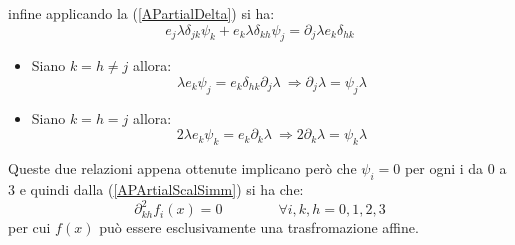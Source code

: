 infine applicando la (\ref{APartialDelta}) si ha:
\begin{equation*}
    e_j\lambda\delta_{jk}\psi_k+e_k\lambda\delta_{kh}\psi_j=\partial_j\lambda e_k \delta_{hk}
\end{equation*}
\begin{itemize}
    \item Siano $k=h\neq j$ allora:
    \begin{equation*}
        \lambda e_k\psi_j=e_k\delta_{hk}\partial_j\lambda \ \Rightarrow \partial_j\lambda=\psi_j\lambda
    \end{equation*}
    \item Siano $k=h= j$ allora:
    \begin{equation*}
        2\lambda e_k\psi_k=e_k\partial_k\lambda \ \Rightarrow 2\partial_k\lambda=\psi_k\lambda
    \end{equation*}
\end{itemize}
Queste due relazioni appena ottenute implicano però che $\psi_i=0$ per ogni i da $0$ a $3$ e quindi dalla 
(\ref{APArtialScalSimm}) si ha che:
\begin{equation}
    \partial_{kh}^2f_i(x)=0 \qquad \qquad \forall i,k,h=0,1,2,3
\end{equation}
per cui $f(x)$ può essere esclusivamente una trasfromazione affine.